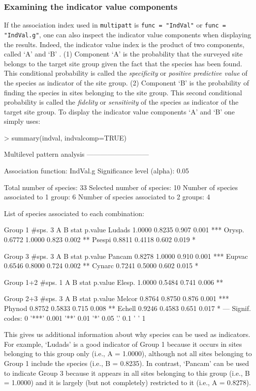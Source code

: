 \documentclass[11pt,a4paper]{article}
\begin{document}
\subsubsection{Examining the indicator value components}
If the association index used in \texttt{multipatt} is \texttt{func = "IndVal"} or \texttt{func = "IndVal.g"}, one can also inspect the indicator value components when displaying the results. Indeed, the indicator value index is the product of two components, called `A' and `B' \citep{Dufrene1997}\citep{DeCaceres2009}. (1) Component `A' is the probability that the surveyed site belongs to the target site group given the fact that the species has been found. This conditional probability is called the \emph{specificity} or \emph{positive predictive value} of the species as indicator of the site group. (2) Component `B' is the probability of finding the species in sites belonging to the site group. This second conditional probability is called the \emph{fidelity} or \emph{sensitivity} of the species as indicator of the target site group. To display the indicator value components `A' and `B' one simply uses:
\begin{Schunk}
\begin{Sinput}
> summary(indval, indvalcomp=TRUE)
\end{Sinput}
\begin{Soutput}
 Multilevel pattern analysis
 ---------------------------

 Association function: IndVal.g
 Significance level (alpha): 0.05

 Total number of species: 33
 Selected number of species: 10 
 Number of species associated to 1 group: 6 
 Number of species associated to 2 groups: 4 

 List of species associated to each combination: 

 Group 1  #sps.  3 
            A      B  stat p.value    
Ludads 1.0000 0.8235 0.907   0.001 ***
Orysp. 0.6772 1.0000 0.823   0.002 ** 
Psespi 0.8811 0.4118 0.602   0.019 *  

 Group 3  #sps.  3 
            A      B  stat p.value    
Pancam 0.8278 1.0000 0.910   0.001 ***
Eupvac 0.6546 0.8000 0.724   0.002 ** 
Cynarc 0.7241 0.5000 0.602   0.015 *  

 Group 1+2  #sps.  1 
            A      B  stat p.value   
Elesp. 1.0000 0.5484 0.741   0.006 **

 Group 2+3  #sps.  3 
            A      B  stat p.value    
Melcor 0.8764 0.8750 0.876   0.001 ***
Phynod 0.8752 0.5833 0.715   0.008 ** 
Echell 0.9246 0.4583 0.651   0.017 *  
---
Signif. codes:  0 '***' 0.001 '**' 0.01 '*' 0.05 '.' 0.1 ' ' 1 
\end{Soutput}
\end{Schunk}
This gives us additional information about why species can be used as indicators. For example, `Ludads' is a good indicator of Group 1 because it occurs in sites belonging to this group only (i.e., A = 1.0000), although not all sites belonging to Group 1 include the species (i.e., B = 0.8235). In contrast, `Pancam' can be used to indicate Group 3 because it appears in all sites belonging to this group (i.e., B = 1.0000) and it is largely (but not completely) restricted to it (i.e., A = 0.8278).
\end{document}

